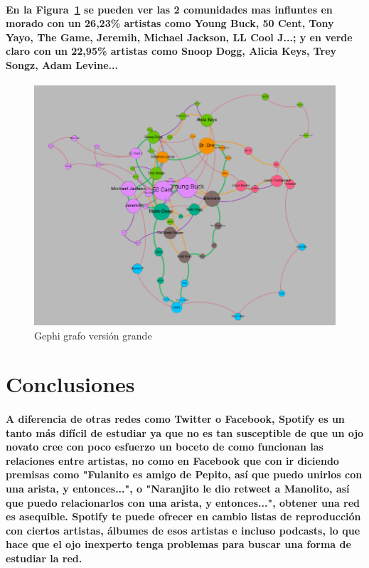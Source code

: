 \documentclass[11pt,spanish]{article}
\begin{document}
\paragraph*{En la Figura~\ref{fig:gephi_bonito} se pueden ver las 2 comunidades mas influntes
 en morado con un 26,23\% artistas como Young Buck, 50 Cent, Tony Yayo, The Game, Jeremih, Michael Jackson, LL Cool J...;
 y en verde claro con un 22,95\% artistas como Snoop Dogg, Alicia Keys, Trey Songz, Adam Levine... }

\begin{figure}[h!]
    \centering
    \includegraphics[width=120mm]{gephi_grafo_bonito.png}
    \caption{Gephi grafo versión grande}\label{fig:gephi_bonito}
\end{figure}
\pagebreak

\section{Conclusiones}

\paragraph*{A diferencia de otras redes como Twitter o Facebook, Spotify es un tanto más difícil de estudiar ya que no es tan susceptible de que un ojo novato cree con poco esfuerzo un boceto de como funcionan las relaciones entre artistas, 
no como en Facebook que con ir diciendo premisas como "Fulanito es amigo de Pepito, así que puedo unirlos con una arista, y entonces...", o "Naranjito le dio retweet a Manolito, así que puedo relacionarlos con una arista, y entonces...", obtener una red es asequible. Spotify te puede ofrecer en cambio listas de reproducción con ciertos artistas, álbumes de esos artistas e incluso podcasts, lo que hace que el ojo inexperto tenga problemas para buscar una forma de estudiar la red. }
\end{document}

